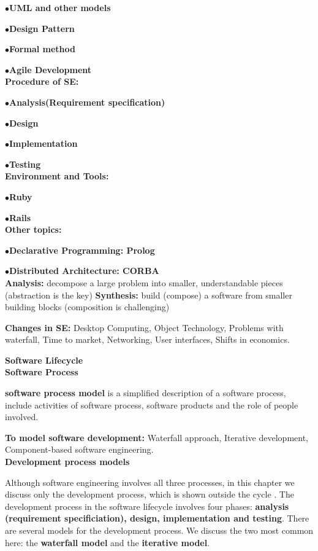 \documentclass[]{report}
\begin{document}
$\bullet$\textbf{UML and other models}

$\bullet$\textbf{Design Pattern}

$\bullet$\textbf{Formal method}

$\bullet$\textbf{Agile Development}\\
\textbf{Procedure of SE: }

$\bullet$\textbf{Analysis(Requirement specification)}

$\bullet$\textbf{Design}

$\bullet$\textbf{Implementation}

$\bullet$\textbf{Testing}\\
\textbf{Environment and Tools: }

$\bullet$\textbf{Ruby}

$\bullet$\textbf{Rails}\\
\textbf{Other topics: }

$\bullet$\textbf{Declarative Programming: Prolog}

$\bullet$\textbf{Distributed Architecture: CORBA}\\

\textbf{Analysis:} decompose a large problem into smaller, understandable pieces
(abstraction is the key)
\textbf{Synthesis:} build (compose) a software from smaller building blocks
(composition is challenging)

\textbf{Changes in SE:} Desktop Computing, Object Technology, Problems with waterfall, Time to market, Networking, User interfaces, Shifts in economics.

\textbf{Software Lifecycle}\\

\textbf{Software Process}

\textbf{software process model} is a simplified description of a software process, include activities of software process, software products and the role of people involved.

\textbf{To model software development: }Waterfall approach,
Iterative development,
Component-based software 
engineering.\\

\textbf{Development process models}

Although software engineering involves all three processes, in this chapter we discuss only the development process, which is shown outside the cycle . The development process in the software lifecycle involves four phases: \textbf{analysis (requirement specificiation), design, implementation and testing}. There are several models for the development process. We discuss the two most common here: the \textbf{waterfall model} and the \textbf{iterative model}.\\
\end{document}

